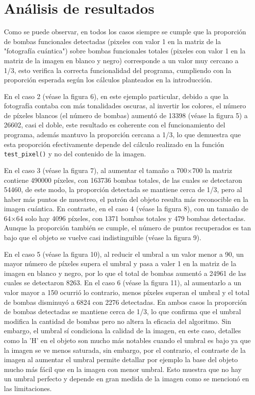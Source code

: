 \documentclass[conference]{IEEEtran}
\begin{document}
\section{Análisis de resultados}
Como se puede observar, en todos los casos siempre se cumple que la proporción de bombas funcionales detectadas (pixeles con valor 1 en la matriz de la "fotografía cuántica")
sobre bombas funcionales totales (pixeles con valor 1 en la matriz de la imagen en blanco y negro) corresponde a un valor muy cercano a 1/3, esto verifica la correcta funcionalidad
del programa, cumpliendo con la proporción esperada según los cálculos planteados en la introducción.

En el caso 2 (véase la figura 6), en este ejemplo particular, debido a que la fotografía contaba con más tonalidades oscuras, al invertir los colores, el número de píxeles blancos (el número de bombas)
aumentó de 13398 (véase la figura 5) a 26602, casi el doble, este resultado es coherente con el funcionamiento del programa, además mantuvo la proporción cercana a 1/3, lo que demuestra que esta proporción efectivamente
depende del cálculo realizado en la función \texttt{test\_pixel()} y no del contenido de la imagen.

En el caso 3 (véase la figura 7), al aumentar el tamaño a 700×700 la matriz contiene 490000 píxeles, con 163736 bombas totales, de las cuales se detectaron 54460, de este modo, la proporción detectada se mantiene cerca de 1/3,
pero al haber más puntos de muestreo, el patrón del objeto resulta más reconocible en la imagen cuántica. En contraste, en el caso 4 (véase la figura 8), con un tamaño de 64×64 solo hay 4096 píxeles, 
con 1371 bombas totales y 479 bombas detectadas. Aunque la proporción también se cumple, el número de puntos recuperados es tan bajo que el objeto se vuelve casi indistinguible (véase la figura 9).

En el caso 5 (véase la figura 10), al reducir el umbral a un valor menor a 90, un mayor número de píxeles supera el umbral y pasa a valer 1 en la matriz de la imagen en blanco y negro, por lo que el total de bombas aumentó a 24961
de las cuales se detectaron 8263. En el caso 6 (véase la figura 11), al aumentarlo a un valor mayor a 150 ocurrió lo contrario, menos píxeles superan el umbral y el total de bombas disminuyó a 6824 con 2276 detectadas. 
En ambos casos la proporción de bombas detectadas se mantiene cerca de 1/3, lo que confirma que el umbral modifica la cantidad de bombas pero no altera la eficacia del algoritmo. Sin embargo, el umbral sí condiciona la calidad de la imagen,
en este caso, detalles como la 'H' en el objeto son mucho más notables cuando el umbral es bajo ya que la imagen se ve menos saturada, sin embargo, por el contrario, el contraste de la imagen al aumentar el umbral permite detallar
por ejemplo la base del objeto mucho más fácil que en la imagen con menor umbral. Esto muestra que no hay un umbral perfecto y depende en gran medida de la imagen como se mencionó en las limitaciones.
\end{document}
